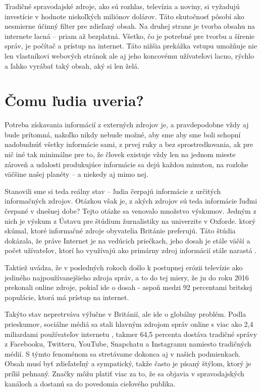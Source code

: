 \documentclass{sig-alternate}
\begin{document}
Tradičné spravodajské zdroje, ako sú rozhlas, televízia a noviny, si vyžadujú investície v hodnote niekoľkých miliónov dolárov. Táto skutočnosť pôsobí ako nesmierne účinný filter pre zdieľaný obsah. Na druhej strane je tvorba obsahu na internete lacná – priam až bezplatná. Všetko, čo je potrebné pre tvorbu a šírenie správ, je počítač a prístup na internet. Táto nižšia prekážka vstupu umožňuje nie len vlastníkovi webových stránok ale aj jeho koncovému užívateľovi lacno, rýchlo a ľahko vyrábať taký obsah, aký si len želá.
\section{Čomu ľudia uveria?}
Potreba získavania informácií z externých zdrojov je, a pravdepodobne vždy aj bude prítomná, nakoľko nikdy nebude možné, aby sme aby sme boli schopní nadobudnúť všetky informácie sami, z prvej ruky a bez sprostredkovania, ak pre nič iné tak minimálne pre to, že človek existuje vždy len na jednom mieste zároveň a udalosti produkujúce informácie sa dejú každou minutou, na rozlohe väčšine našej planéty – a niekedy aj mimo nej.

Stanovili sme si teda reálny stav – ľudia čerpajú informácie z určitých informačných zdrojov. Otázkou však je, z akých zdrojov sú teda informácie ľuďmi čerpané v dnešnej dobe? Tejto otázke sa venovalo množstvo výskumov. Jedným z nich je výskum z Ústavu pre štúdium žurnalistiky na univerzite v Oxforde. ktorý skúmal, ktoré informačné zdroje obyvatelia Británie preferujú. Táto štúdia dokázala, že práve Internet je na vedúcich priečkach, jeho dosah je stále väčší a počet užívateľov, ktorí ho využívajú ako primárny zdroj informácií stále narastá .

Taktiež uvádza, že v posledných rokoch došlo k postupnej erózii televízie ako jediného najpoužívanejšieho zdroja správ, a to do tej miery, že ju do roku 2016 prekonali online zdroje, pokiaľ ide o dosah - aspoň medzi 92 percentami britskej populácie, ktorá má prístup na internet. \cite{k}

Takýto stav nepretrváva výlučne v Británií, ale ide o globálny problém. Podla prieskumov, sociálne médiá sa stali hlavným zdrojom správ online s viac ako 2,4 miliardami používateľov internetu , takmer 64,5 percenta dostáva tradičné správy z Facebooku, Twitteru, YouTube, Snapchatu a Instagramu namiesto tradičných médií. S týmto fenoménom sa stretávame dokonca aj v našich podmienkach. Obsah musí byť zdieľateľný a sympatický, takže často je písaný štýlom, ktorý je príliš pehnaný. Značky môžu platiť viac za to, že sa objavia v spravodajských kanáloch a dostanú sa do povedomia cieľového publika.\cite{l}
\end{document}
